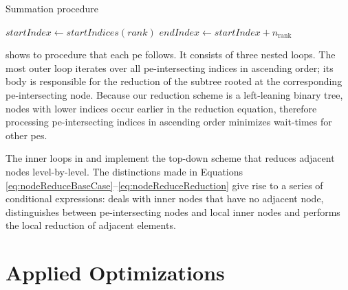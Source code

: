 \begin{algorithm}
\caption{Summation procedure}\label{algo:SummationAlgo}
\DontPrintSemicolon
\SetAlgoLined
$startIndex \gets startIndices (rank)$\;
$endIndex \gets startIndex + n_{\textrm{rank}}$\;
\end{algorithm}

 shows to procedure that each \gls{pe} follows.
It consists of three nested loops.
The most outer loop iterates over all \gls{pe}-intersecting indices in ascending order; its body is responsible for the reduction of the subtree rooted at the corresponding \gls{pe}-intersecting node.
Because our reduction scheme is a left-leaning binary tree, nodes with lower indices occur earlier in the reduction equation, therefore processing \gls{pe}-intersecting indices in ascending order minimizes wait-times for other \glspl{pe}.


The inner loops in  and  implement the top-down scheme that reduces adjacent nodes level-by-level.
The distinctions made in Equations \eqref{eq:nodeReduceBaseCase}--\eqref{eq:nodeReduceReduction} give rise to a series of conditional expressions:  deals with inner nodes that have no adjacent node,  distinguishes between \gls{pe}-intersecting nodes and local inner nodes and  performs the local reduction of adjacent elements.

\section{Applied Optimizations}
\label{sec:AppliedOptimizations}

